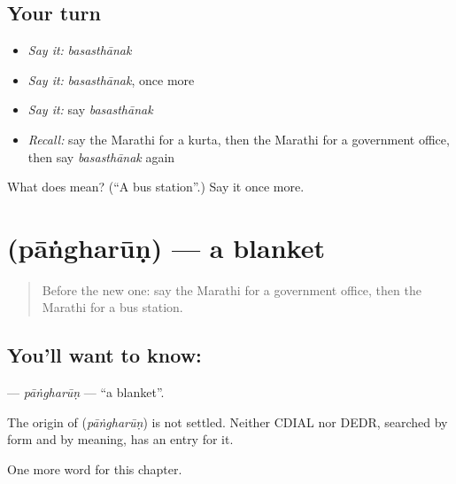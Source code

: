\subsection*{Your turn}
\begin{itemize}
\raggedright
  \item \emph{Say it:} \emph{basasthānak}
  \item \emph{Say it:} \emph{basasthānak}, once more
  \item \emph{Say it:} say \emph{basasthānak}
  \item \emph{Recall:} say the Marathi for a kurta, then the Marathi for a government office, then say \emph{basasthānak} again
\end{itemize}

\begin{tcolorbox}[breakable,colback=teal!4,colframe=teal!35!black,title={Before you move on}]
What does  mean? (\textquotedblleft{}A bus station\textquotedblright{}.) Say it once more.
\end{tcolorbox}
\section[\texorpdfstring{\mr{पांघरूण} (pāṅgharūṇ)}{पांघरूण (pāṅgharūṇ)}]{ (pāṅgharūṇ) — a blanket}

\label{lesson:MR-C271-pangharun}



\begin{quote}
Before the new one: say the Marathi for a government office, then the Marathi for a bus station.
\end{quote}

\subsection*{You'll want to know: }
\textbf{} — \emph{pāṅgharūṇ} — \textquotedblleft{}a blanket\textquotedblright{}.

\begin{cousinweb}
The origin of \textbf{} (\emph{pāṅgharūṇ}) is not settled. Neither CDIAL nor DEDR, searched by form and by meaning, has an entry for it.
\end{cousinweb}

\begin{grammarlens}[title={What you've built}]
One more word for this chapter.
\end{grammarlens}

